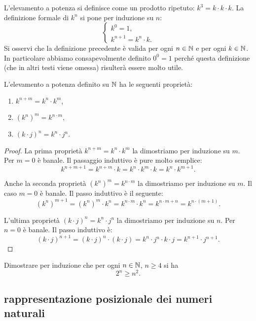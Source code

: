 L'elevamento a potenza si definisce come un prodotto ripetuto: $k^3 = k\cdot k\cdot k$.
La definizione formale di $k^n$ si pone per induzione su $n$:
\[
\begin{cases}
  k^0 = 1, \\
  k^{n+1} = k^n\cdot k.
\end{cases}  
\]
Si osservi che la definizione precedente è valida per ogni $n\in {\mathbb N}$ e 
per ogni $k\in {\mathbb N}$.
In particolare abbiamo consapevolmente definito $0^0=1$ perché 
questa definizione (che in altri testi viene omessa) risulterà essere molto utile.

\begin{theorem}
  L'elevamento a potenza definito su ${\mathbb N}$ ha le seguenti proprietà:
  \begin{enumerate}
    \item $k^{n+m} = k^n \cdot k^m$,
    \item $(k^n)^m = k^{n\cdot m}$,
    \item $(k\cdot j)^n = k^n\cdot j^n$. 
  \end{enumerate}
\end{theorem}
%
\begin{proof}
La prima proprietà $k^{n+m}=k^n\cdot k^m$ la dimostriamo per induzione su $m$.
Per $m=0$ è banale. Il passaggio induttivo è pure molto semplice:
\[
  k^{n+m+1} = k^{n+m}\cdot k = k^n\cdot k^m\cdot k
  = k^n\cdot k^{m+1}.
\]

Anche la seconda proprietà $(k^n)^m = k^{n\cdot m}$ la dimostriamo per induzione 
su $m$. Il caso $m=0$ è banale. Il passo induttivo è il seguente:
\[
(k^n)^{m+1} = (k^n)^m \cdot k^n = k^{n\cdot m}\cdot k^n 
= k^{n\cdot m + n} = k^{n\cdot(m+1)}.  
\]

L'ultima proprietà $(k\cdot j)^n = k^n\cdot j^n$ la dimostriamo per induzione 
su $n$. Per $n=0$ è banale. Il passo induttivo è:
\[
(k\cdot j)^{n+1}=(k\cdot j)^n \cdot (k\cdot j)
= k^n\cdot j^n \cdot k \cdot j = k^{n+1}\cdot j^{n+1}.  
\]
\end{proof}

\begin{exercise}
  Dimostrare per induzione che per ogni $n\in {\mathbb N}$, $n\ge 4$ si ha 
  \[  
    2^n \ge n^2.
  \]
\end{exercise}

\subsection{rappresentazione posizionale dei numeri naturali}

